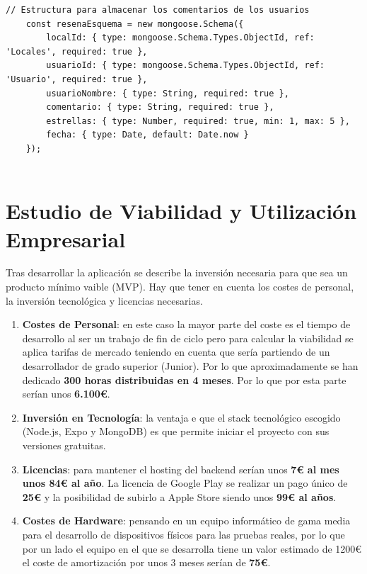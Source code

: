 \documentclass[a4paper,11pt]{article}
\begin{document}
\begin{itemize}
\begin{lstlisting}[style=javascript, caption={Estructura para almacenar los locales en la Base de Datos.}]
    // Estructura para almacenar los comentarios de los usuarios
    const resenaEsquema = new mongoose.Schema({
        localId: { type: mongoose.Schema.Types.ObjectId, ref: 'Locales', required: true },
        usuarioId: { type: mongoose.Schema.Types.ObjectId, ref: 'Usuario', required: true },
        usuarioNombre: { type: String, required: true },
        comentario: { type: String, required: true },
        estrellas: { type: Number, required: true, min: 1, max: 5 },
        fecha: { type: Date, default: Date.now }
    });
        
    \end{lstlisting}
\end{itemize}

\section{Estudio de Viabilidad y Utilización Empresarial}

Tras desarrollar la aplicación se describe la inversión necesaria para que sea un producto mínimo vaible (MVP). Hay que tener en cuenta los costes de personal, la inversión tecnológica y licencias necesarias. 

\begin{enumerate}
    \item \textbf{Costes de Personal}: en este caso la mayor parte del coste es el tiempo de desarrollo al ser un trabajo de fin de ciclo pero para calcular la viabilidad se aplica tarifas de mercado teniendo en cuenta que sería partiendo de un desarrollador de grado superior (Junior). Por lo que aproximadamente se han dedicado \textbf{300 horas distribuidas en 4 meses}. Por lo que por esta parte serían unos \textbf{6.100€}.
    \item \textbf{Inversión en Tecnología}: la ventaja e que el stack tecnológico escogido (Node.js, Expo y MongoDB) es que permite iniciar el proyecto con sus versiones gratuitas.
    \item \textbf{Licencias}: para mantener el hosting del backend serían unos \textbf{7€ al mes unos 84€ al año}. La licencia de Google Play se realizar un pago único de \textbf{25€} y la posibilidad de subirlo a Apple Store siendo unos \textbf{99€ al años}.
    \item \textbf{Costes de Hardware}: pensando en un equipo informático de gama media para el desarrollo de dispositivos físicos para las pruebas reales, por lo que por un lado el equipo en el que se desarrolla tiene un valor estimado de 1200€ el coste de amortización por unos 3 meses serían de \textbf{75€}.
\end{enumerate}
\end{document}
